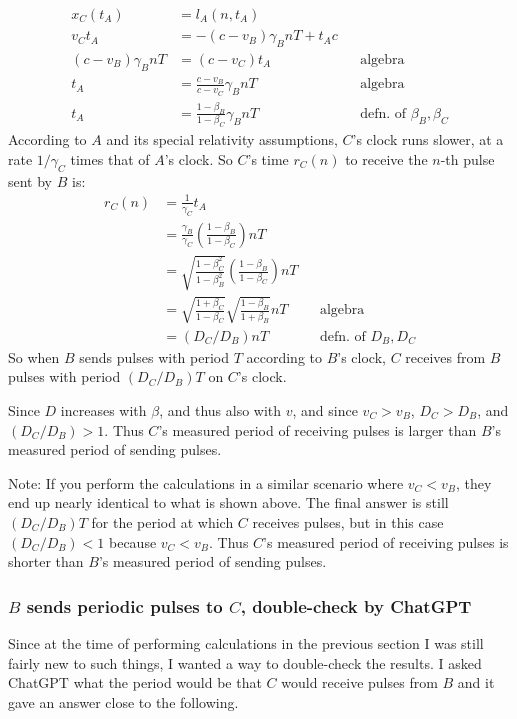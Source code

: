 \documentclass[a4paper]{article}
\theoremstyle{plain}
\theoremstyle{definition}
\begin{document}
\begin{align*}
x_C(t_A) & = l_A(n, t_A) \\
v_C t_A  & = -(c - v_B) \gamma_B nT + t_A c \\
(c - v_B) \gamma_B nT & = (c - v_C) t_A & & \text{algebra} \\
t_A & = \frac{c - v_B}{c - v_C} \gamma_B nT & & \text{algebra} \\
t_A & = \frac{1 - \beta_B}{1 - \beta_C} \gamma_B nT & & \text{defn. of $\beta_B, \beta_C$}
\end{align*}
According to $A$ and its special relativity assumptions,
$C$'s clock runs slower, at a rate $1/\gamma_C$ times that of $A$'s clock.
So $C$'s time $r_C(n)$ to receive the $n$-th pulse sent by $B$ is:
\begin{align}
r_C(n) & = \frac{1}{\gamma_C} t_A \\
       & = \frac{\gamma_B}{\gamma_C} \left( \frac{1-\beta_B}{1-\beta_C} \right) nT \\
       & = \sqrt{ \frac{1-\beta_C^2}{1-\beta_B^2} } \left( \frac{1-\beta_B}{1-\beta_C} \right) nT \\
       & = \sqrt{ \frac{1+\beta_C}{1-\beta_C} } \sqrt { \frac{1-\beta_B}{1+\beta_B} } nT & & \text{algebra} \\
       & = ( D_C / D_B ) nT & & \text{defn. of $D_B, D_C$}
\end{align}
So when $B$ sends pulses with period $T$ according to $B$'s clock,
$C$ receives from $B$ pulses with period $(D_C / D_B) T$ on $C$'s clock.

Since $D$ increases with $\beta$, and thus also with $v$, and since
$v_C > v_B$, $D_C > D_B$, and $(D_C / D_B) > 1$.  Thus $C$'s measured
period of receiving pulses is larger than $B$'s measured period of
sending pulses.

Note: If you perform the calculations in a similar scenario where
$v_C < v_B$, they end up nearly identical to what is shown above.
The final answer is still $(D_C / D_B) T$ for the period at which $C$
receives pulses, but in this case $(D_C / D_B) < 1$ because $v_C < v_B$.
Thus $C$'s measured period of receiving pulses is shorter than $B$'s
measured period of sending pulses.


\subsubsection{$B$ sends periodic pulses to $C$, double-check by ChatGPT}
\label{sec:scen2BtoCdoublecheck}

Since at the time of performing calculations in the previous section I
was still fairly new to such things, I wanted a way to double-check
the results.  I asked ChatGPT what the period would be that $C$ would
receive pulses from $B$ and it gave an answer close to the following.
\end{document}

